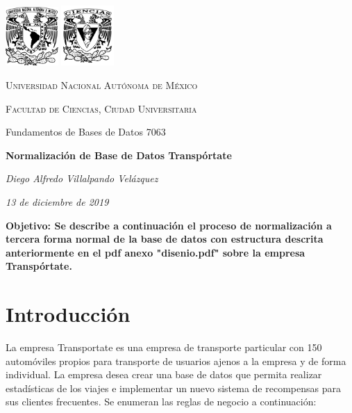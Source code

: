 \documentclass{article}
\begin{document}

{\centering 
\noindent\hrulefill \par \vspace{0.5cm}
\includegraphics[width=2cm]{unam.png} \hspace{11.5cm}
\includegraphics[width=2cm]{ciencias.png}\vspace{-2.2cm}
     {\scshape\Large Universidad Nacional Autónoma de México \par}
     {\scshape\Large Facultad de Ciencias, Ciudad Universitaria \par}
     {\Large Fundamentos de Bases de Datos 7063\par}
     \vspace{0.2cm}
     {\Large\bfseries Normalización de Base de Datos Transpórtate \par}
     \vspace{0.2cm}
     {\large\itshape Diego Alfredo Villalpando Velázquez \par \vspace{0.2cm}}
     {\large\itshape 13 de diciembre de 2019\par} \vspace{0.35cm}
     \noindent\hrulefill
}

\vspace{0.5cm}
       { \bfseries
         Objetivo:
         Se describe a continuación el proceso de normalización a tercera forma normal
         de la base de datos con estructura descrita anteriormente en el pdf anexo
         "disenio.pdf" sobre la empresa Transpórtate.
       }
       
       \noindent \tableofcontents

       
       \section{Introducción}
       {
         La empresa Transportate es una empresa de transporte particular con 150 automóviles
         propios para transporte de usuarios ajenos a la empresa y de forma individual. La
         empresa desea crear una base de datos que permita realizar estadísticas
         de los viajes e implementar un nuevo sistema de recompensas para sus clientes
         frecuentes. Se enumeran las reglas de negocio a continuación:
       }
       
\end{document}
